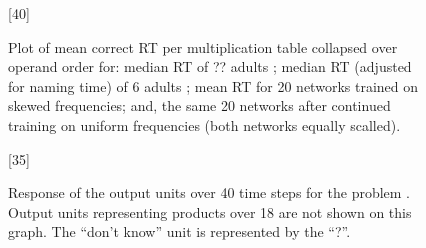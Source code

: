 
\begin{figure}[hbt]
%
\begin{minipage}[b]{7.5cm} %
[40]
\caption{Plot of mean correct RT per multiplication table collapsed over
operand order for: median RT of ?? adults
\protect\cite[app.~D]{harlasso};
median RT (adjusted for naming time) of 6 adults
\protect\cite[table~A1]{millcogn};
mean RT for 20 networks trained on skewed frequencies; and, the same 20
networks after continued training on uniform frequencies (both networks
equally scalled).}
\label{rt01}
\end{minipage}   %
%
%
\hspace{0.3cm}
%
\begin{minipage}[b]{7.5cm} %
[35]
\caption{Response of the output units over 40 time steps for the problem
.  Output units representing products over 18 are not shown on this
graph. The ``don't know'' unit is represented by the ``?''.}
\label{act01plot}
\end{minipage}   %
%
\end{figure}
